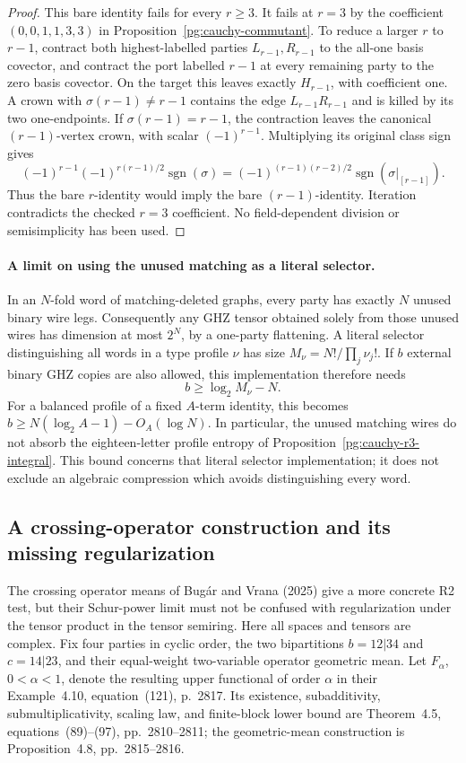 \begin{proof}
This bare identity fails for every $r\geq3$. It fails at $r=3$ by the
coefficient $(0,0,1,1,3,3)$ in
Proposition~\ref{pg:cauchy-commutant}. To reduce a larger $r$ to $r-1$,
contract both highest-labelled parties $L_{r-1},R_{r-1}$ to the all-one
basis covector, and contract the port labelled $r-1$ at every remaining
party to the zero basis covector. On the target this leaves exactly
$H_{r-1}$, with coefficient one. A crown with
$\sigma(r-1)\ne r-1$ contains the edge
$L_{r-1}R_{r-1}$ and is killed by its two one-endpoints. If
$\sigma(r-1)=r-1$, the contraction leaves the canonical $(r-1)$-vertex
crown, with scalar $(-1)^{r-1}$. Multiplying its original class sign gives
\[
 (-1)^{r-1}(-1)^{r(r-1)/2}\operatorname{sgn}(\sigma)
 =(-1)^{(r-1)(r-2)/2}\operatorname{sgn}(\sigma|_{[r-1]}).
\]
Thus the bare $r$-identity would imply the bare $(r-1)$-identity.
Iteration contradicts the checked $r=3$ coefficient. No field-dependent
division or semisimplicity has been used.
\end{proof}

\paragraph{A limit on using the unused matching as a literal selector.}
In an $N$-fold word of matching-deleted graphs, every party has exactly $N$
unused binary wire legs. Consequently any GHZ tensor obtained solely from
those unused wires has dimension at most $2^N$, by a one-party flattening.
A literal selector distinguishing all words in a type profile $\nu$ has
size $M_\nu=N!/\prod_j\nu_j!$. If $b$ external binary GHZ copies are also
allowed, this implementation therefore needs
\[
 b\geq\log_2 M_\nu-N.
\]
For a balanced profile of a fixed $A$-term identity, this becomes
$b\geq N(\log_2 A-1)-O_A(\log N)$. In particular, the unused matching
wires do not absorb the eighteen-letter profile entropy of
Proposition~\ref{pg:cauchy-r3-integral}. This bound concerns that literal
selector implementation; it does not exclude an algebraic compression
which avoids distinguishing every word.

\subsection{A crossing-operator construction and its missing regularization}

The crossing operator means of Bug\'ar and Vrana (2025) give a more
concrete R2 test, but their Schur-power limit must not be confused
with regularization under the tensor product in the tensor semiring.
Here all spaces and tensors are complex. Fix four parties in cyclic
order, the two bipartitions $b=12|34$ and $c=14|23$, and their
equal-weight two-variable operator geometric mean. Let $F_\alpha$,
$0<\alpha<1$, denote the resulting upper functional of order
$\alpha$ in their Example~4.10, equation~(121), p.~2817.
Its existence, subadditivity, submultiplicativity, scaling law, and
finite-block lower bound are Theorem~4.5, equations~(89)--(97),
pp.~2810--2811; the geometric-mean construction is
Proposition~4.8, pp.~2815--2816.


